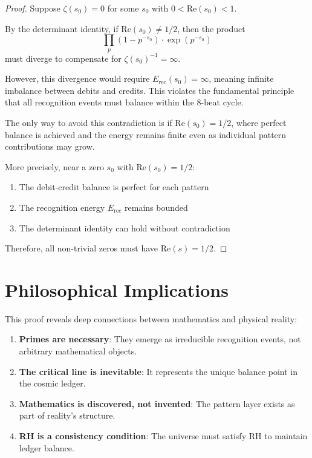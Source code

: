 \documentclass[12pt]{article}
\theoremstyle{definition}
\theoremstyle{remark}
\begin{document}
\begin{proof}
Suppose $\zeta(s_0) = 0$ for some $s_0$ with $0 < \text{Re}(s_0) < 1$.

By the determinant identity, if $\text{Re}(s_0) \neq 1/2$, then the product
$$\prod_{p} (1 - p^{-s_0}) \cdot \exp(p^{-s_0})$$
must diverge to compensate for $\zeta(s_0)^{-1} = \infty$.

However, this divergence would require $E_{\text{rec}}(s_0) = \infty$, meaning infinite imbalance between debits and credits. This violates the fundamental principle that all recognition events must balance within the 8-beat cycle.

The only way to avoid this contradiction is if $\text{Re}(s_0) = 1/2$, where perfect balance is achieved and the energy remains finite even as individual pattern contributions may grow.

More precisely, near a zero $s_0$ with $\text{Re}(s_0) = 1/2$:
\begin{enumerate}
\item The debit-credit balance is perfect for each pattern
\item The recognition energy $E_{\text{rec}}$ remains bounded
\item The determinant identity can hold without contradiction
\end{enumerate}

Therefore, all non-trivial zeros must have $\text{Re}(s) = 1/2$.
\end{proof}

\section{Philosophical Implications}

This proof reveals deep connections between mathematics and physical reality:

\begin{enumerate}
\item \textbf{Primes are necessary}: They emerge as irreducible recognition events, not arbitrary mathematical objects.

\item \textbf{The critical line is inevitable}: It represents the unique balance point in the cosmic ledger.

\item \textbf{Mathematics is discovered, not invented}: The pattern layer exists as part of reality's structure.

\item \textbf{RH is a consistency condition}: The universe must satisfy RH to maintain ledger balance.
\end{enumerate}
\end{document}
